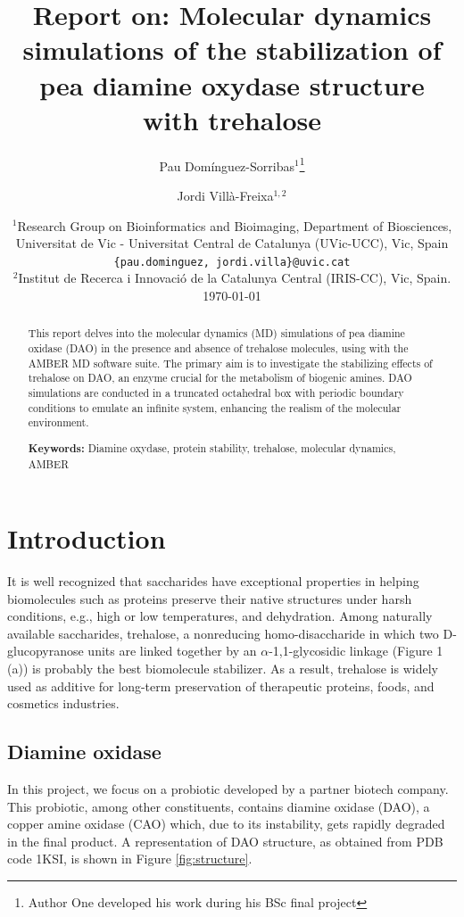 \documentclass[a4paper]{article}
\title{Report on: Molecular dynamics simulations of the stabilization of pea diamine oxydase structure with trehalose}
\author{Pau Domínguez-Sorribas$^1$\thanks{Author One developed his work during his BSc final project} \and Jordi Villà-Freixa$^{1,2}$\orcidlink{0000-0002-6359-3929}}
\date{
	$^1$Research Group on Bioinformatics and Bioimaging, Department of Biosciences, Universitat de Vic - Universitat Central de Catalunya (UVic-UCC), Vic, Spain \\ \texttt{\{pau.dominguez, jordi.villa\}@uvic.cat}\\
	$^2$Institut de Recerca i Innovació de la Catalunya Central (IRIS-CC), Vic, Spain. \\[2ex]%
	\today
}
\begin{document}
	\maketitle
	
	\begin{abstract}
		
		This report delves into the molecular dynamics (MD) simulations of pea diamine oxidase (DAO) in the presence and absence of trehalose molecules, using with the AMBER MD software suite. The primary aim is to investigate the stabilizing effects of trehalose on DAO, an enzyme crucial for the metabolism of biogenic amines. DAO simulations are conducted in a truncated octahedral box with periodic boundary conditions to emulate an infinite system, enhancing the realism of the molecular environment. 
		
		\noindent\textbf{Keywords:} Diamine oxydase, protein stability, trehalose, molecular dynamics, AMBER
	\end{abstract}

	\tableofcontents

		\section{Introduction}
	\label{sec:intro}
	
	It is well recognized that saccharides have exceptional properties in helping biomolecules such as proteins preserve their native structures under harsh conditions, e.g., high or low temperatures, and dehydration\cite{shao_trehalose_2019,crowe_lessons_2002,cao_effect_2008}. Among naturally available saccharides, trehalose, a nonreducing homo-disaccharide in which two D-glucopyranose units are linked together by an $\alpha$-1,1-glycosidic linkage (Figure 1 (a)) is probably the best biomolecule stabilizer\cite{hedoux_thermostabilization_2009,shao_trehalose_2019,jain_role_2008,jain_effect_2009,kaushik_why_2003}. As a result, trehalose is widely used as additive for long-term preservation of therapeutic proteins, foods, and cosmetics industries\cite{carpenter_rational_1997,higashiyama_novel_2002,arakawa_factors_2001,shao_trehalose_2019}.

	\subsection{Diamine oxidase}

In this project, we focus on a probiotic developed by a partner biotech company. This probiotic, among other constituents, contains diamine oxidase (DAO), a copper amine oxidase (CAO) which, due to its instability, gets rapidly degraded in the final product. A representation of DAO structure, as obtained from PDB code 1KSI\cite{1ksi}, is shown in Figure \ref{fig:structure}.
\end{document}

